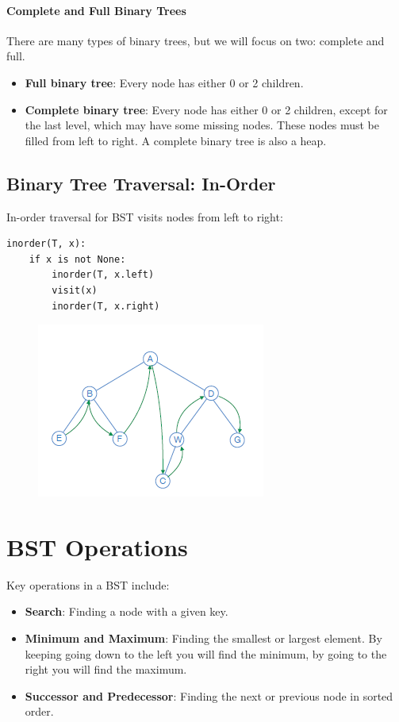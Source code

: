 \paragraph{Complete and Full Binary Trees} There are many types of binary trees, but we will focus on two: complete and full.
\begin{itemize}
    \item \textbf{Full binary tree}: Every node has either 0 or 2 children.
    \item \textbf{Complete binary tree}: Every node has either 0 or 2 children, except for the last level, which may have some missing nodes. These nodes must be filled from left to right. A complete binary tree is also a heap.
\end{itemize}


\subsection{Binary Tree Traversal: In-Order}
In-order traversal for BST visits nodes from left to right:
\begin{verbatim}
inorder(T, x):
    if x is not None:
        inorder(T, x.left)
        visit(x)
        inorder(T, x.right)
\end{verbatim}
\begin{figure}[h!]
    \centering
    \includegraphics[width=0.6\linewidth]{immagini/tree6.png}
\end{figure}
\section{BST Operations}
Key operations in a BST include:
\begin{itemize}
    \item \textbf{Search}: Finding a node with a given key.
    \item \textbf{Minimum and Maximum}: Finding the smallest or largest element. By keeping going down to the left you will find the minimum, by going to the right you will find the maximum.
    \item \textbf{Successor and Predecessor}: Finding the next or previous node in sorted order.
\end{itemize}
